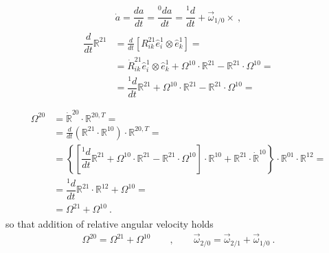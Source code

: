 \documentclass[letterpaper,10pt,english]{jupyterBook}
\begin{document}
\begin{equation*}
\begin{split}\dot{a} = \dfrac{d a}{d t} = \dfrac{{}^0 d a}{d t} = \dfrac{{}^1 d}{dt} + \vec{\omega}_{1/0} \times \ ,\end{split}
\end{equation*}\begin{equation*}
\begin{split}\begin{aligned}
\dfrac{d}{dt} \mathbb{R}^{21} 
  & = \frac{d}{dt} \left[ R^{21}_{ik} \hat{e}^1_i \otimes \hat{e}^1_k \right] = \\
  & = \dot{R}^{21}_{ik} \hat{e}^1_i \otimes \hat{e}^1_k + \mathbb{\Omega}^{10} \cdot  \mathbb{R}^{21} - \mathbb{R}^{21} \cdot \mathbb{\Omega}^{10} = \\
  & = \dfrac{{}^1 d}{dt} \mathbb{R}^{21} + \mathbb{\Omega}^{10} \cdot  \mathbb{R}^{21} - \mathbb{R}^{21} \cdot \mathbb{\Omega}^{10} = \\
\end{aligned}\end{split}
\end{equation*}\begin{equation*}
\begin{split}\begin{aligned}
 \mathbb{\Omega}^{20}
 & = \dot{\mathbb{R}}^{20} \cdot \mathbb{R}^{20, T} = \\
 & = \frac{d}{dt} \left( \mathbb{R}^{21} \cdot \mathbb{R}^{10} \right) \cdot \mathbb{R}^{20, T} = \\
 & = \left\{ \left[ \dfrac{{}^1 d}{dt} \mathbb{R}^{21} + \mathbb{\Omega}^{10} \cdot  \mathbb{R}^{21} - \mathbb{R}^{21} \cdot \mathbb{\Omega}^{10} \right] \cdot \mathbb{R}^{10} + \mathbb{R}^{21} \cdot \dot{\mathbb{R}}^{10}  \right\} \cdot \mathbb{R}^{01} \cdot \mathbb{R}^{12} = \\
 & =  \dfrac{{}^1 d}{dt} \mathbb{R}^{21} \cdot \mathbb{R}^{12} + \mathbb{\Omega}^{10} = \\
 & = \mathbb{\Omega}^{21} + \mathbb{\Omega}^{10} \ .
\end{aligned}\end{split}
\end{equation*}
\sphinxAtStartPar
so that addition of relative angular velocity holds
\begin{equation*}
\begin{split}\mathbb{\Omega}^{20} = \mathbb{\Omega}^{21} + \mathbb{\Omega}^{10} \qquad , \qquad \vec{\omega}_{2/0} = \vec{\omega}_{2/1} + \vec{\omega}_{1/0} \ .\end{split}
\end{equation*}
\end{document}
